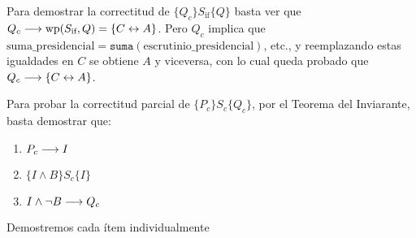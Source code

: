 \documentclass[10pt,a4paper]{article}
\newcommand{\predRef}{\texttt}
\newcommand{\var}{\text}
\renewcommand{\wp}{\text{wp}}
\begin{document}
Para demostrar la correctitud de $\{Q_c\}S_{\text{if}}\{Q\}$ basta ver que $Q_c\implica \wp(S_{\text{if}}, Q) = \{C \Iff A\}$. Pero $Q_c$ implica que $\var{suma\_presidencial} = \predRef{suma}(\var{escrutinio\_presidencial})$, etc., y reemplazando estas igualdades en $C$ se obtiene $A$ y viceversa, con lo cual queda probado que $Q_c\longrightarrow \{C\leftrightarrow A\}$.

Para probar la correctitud parcial de $\{P_c\}S_c\{Q_c\}$, por el Teorema del Inviarante, basta demostrar que:
\begin{enumerate}
    \itemsep 0em
    \item $P_c\longrightarrow I$ 
    \item $\{I\land B\}S_c\{I\}$
    \item $I\land \neg B\longrightarrow Q_c$
\end{enumerate}
Demostremos cada ítem individualmente
\end{document}
